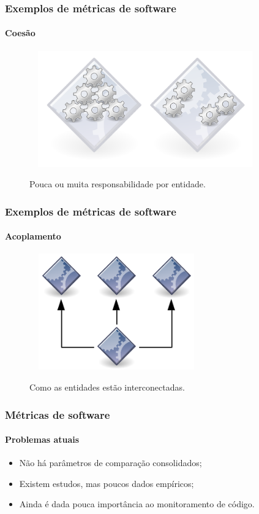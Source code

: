 \documentclass{beamer}
\begin{document}
\begin{frame}
  \frametitle{Exemplos de métricas de software}
  \framesubtitle{Coesão}

  \begin{figure}
    \begin{center}
      \includegraphics[width=10cm, height=5cm]{images/cohesion.png}
      \label{fig: cohesion}
      \caption{Pouca ou muita responsabilidade por entidade.}
    \end{center}
  \end{figure}
\end{frame}

\begin{frame}
  \frametitle{Exemplos de métricas de software}
  \framesubtitle{Acoplamento}

  \begin{figure}
    \begin{center}
      \includegraphics[width=7.5cm, height=5cm]{images/coupling.png}
      \label{fig: coupling}
      \caption{Como as entidades estão interconectadas.}
    \end{center}
  \end{figure}
\end{frame}

\begin{frame}
  \frametitle{Métricas de software}
  \framesubtitle{Problemas atuais}

  \begin{itemize}
    \item Não há parâmetros de comparação consolidados;
    \item Existem estudos, mas poucos dados empíricos;
    \item Ainda é dada pouca importância ao monitoramento de código.
  \end{itemize}
\end{frame}
\end{document}

